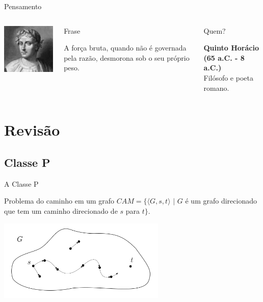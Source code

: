 \documentclass[xcolor=dvipsnames,table]{beamer}
\begin{document}
	\begin{frame}{Pensamento}
		\begin{columns}
		  		\begin{center}
		    		\includegraphics[height=.5\textheight]{images/horacio.jpg}
		  		\end{center}
				\begin{block}{Frase}
					\begin{center}
						{\large A força bruta, quando não é governada pela razão, desmorona sob o seu próprio peso.}
					\end{center}
				\end{block}		  		
		  		\begin{block}{Quem?}
		  			\begin{center}
						{\bf Quinto Horácio (65 a.C. - 8 a.C.)} \\ Filósofo e poeta romano.
					\end{center}
				\end{block}
		\end{columns}
	\end{frame}
	

\section{Revisão}	
	\subsection{Classe P}
	
	\begin{frame}{A Classe P}
		\begin{block}{Problema do caminho em um grafo}
			$CAM = \{ \langle G, s, t \rangle \mbox{ | } G$ é um grafo direcionado que tem um caminho direcionado de $s$ para $t \}$.
		\end{block} 
		\begin{center}
			\includegraphics[width=8cm]{images/cam.png}
		\end{center}
	\end{frame}
	
\end{document}
